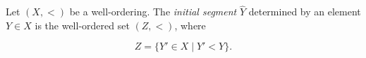 Let $(X, <)$ be a well-ordering. The \textit{initial segment} $\hat{Y}$ determined by an element $Y \in X$ is the well-ordered set $(Z, <)$, where

$$Z = \{Y' \in X \mid Y' < Y\}.$$
